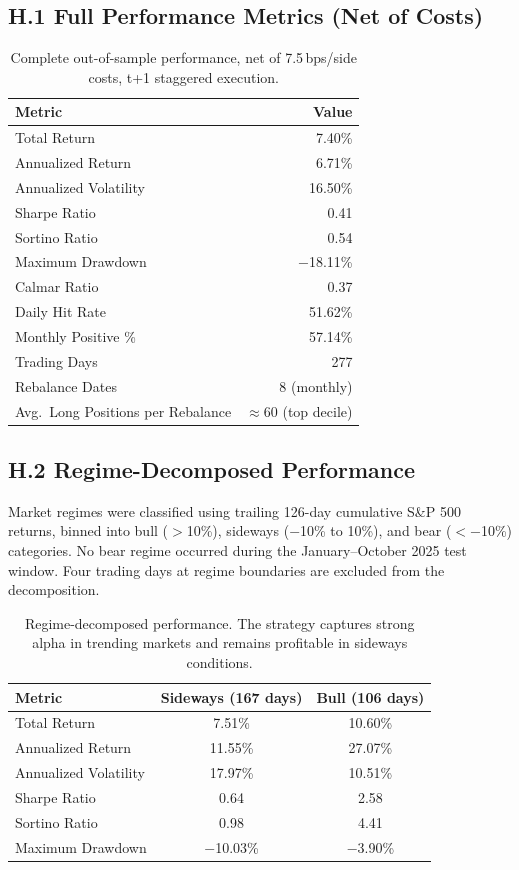 \documentclass[11pt, a4paper]{article}
\begin{document}
\subsection*{H.1 Full Performance Metrics (Net of Costs)}
\begin{table}[h]
\centering
\begin{tabular}{lr}
\toprule
\textbf{Metric} & \textbf{Value} \\
\midrule
Total Return & 7.40\% \\
Annualized Return & 6.71\% \\
Annualized Volatility & 16.50\% \\
Sharpe Ratio & 0.41 \\
Sortino Ratio & 0.54 \\
Maximum Drawdown & $-$18.11\% \\
Calmar Ratio & 0.37 \\
Daily Hit Rate & 51.62\% \\
Monthly Positive \% & 57.14\% \\
Trading Days & 277 \\
Rebalance Dates & 8 (monthly) \\
Avg.\ Long Positions per Rebalance & $\approx$60 (top decile) \\
\bottomrule
\end{tabular}
\caption{Complete out-of-sample performance, net of 7.5\,bps/side costs, t+1 staggered execution.}
\end{table}

\subsection*{H.2 Regime-Decomposed Performance}
Market regimes were classified using trailing 126-day cumulative S\&P 500 returns, binned into bull ($>$10\%), sideways ($-$10\% to 10\%), and bear ($<-$10\%) categories. No bear regime occurred during the January--October 2025 test window. Four trading days at regime boundaries are excluded from the decomposition.

\begin{table}[h]
\centering
\begin{tabular}{lcc}
\toprule
\textbf{Metric} & \textbf{Sideways (167 days)} & \textbf{Bull (106 days)} \\
\midrule
Total Return & 7.51\% & 10.60\% \\
Annualized Return & 11.55\% & 27.07\% \\
Annualized Volatility & 17.97\% & 10.51\% \\
Sharpe Ratio & 0.64 & 2.58 \\
Sortino Ratio & 0.98 & 4.41 \\
Maximum Drawdown & $-$10.03\% & $-$3.90\% \\
\bottomrule
\end{tabular}
\caption{Regime-decomposed performance. The strategy captures strong alpha in trending markets and remains profitable in sideways conditions.}
\end{table}
\end{document}
